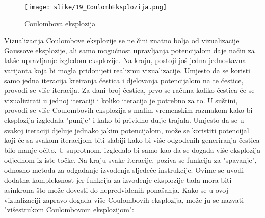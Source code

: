 \documentclass{foi}
\begin{document}
\begin{figure}[H]
    \centering
    \texttt{[image: slike/19\_CoulombEksplozija.png]}
    \captionsetup{justification=centering}
    \caption{Coulombova eksplozija}
\label{fig:CoulombEksplozija}
\end{figure}

Vizualizacija Coulombove eksplozije se ne čini znatno bolja od vizualizacije Gaussove eksplozije, ali samo mogućnost upravljanja potencijalom daje način za lakše upravljanje izgledom eksplozije. Na kraju, postoji još jedna jednostavna varijanta koja bi mogla pridonijeti realizmu vizualizacije. Umjesto da se koristi samo jedna iteracija kreiranja čestica i djelovanja potencijalom na te čestice, provodi se više iteracija. Za dani broj čestica, prvo se računa koliko čestica će se vizualizirati u jednoj iteraciji i koliko iteracija je potrebno za to. U suštini, provodi se više Coulombovih eksplozija s malim vremenskim razmakom kako bi eksplozija izgledala "punije" i kako bi prividno dulje trajala. Umjesto da se u svakoj iteraciji djeluje jednako jakim potencijalom, može se koristiti potencijal koji će sa svakom iteracijom biti slabiji kako bi više odgođenih generiranja čestica bilo manje očito. U suprotnom, izgledalo bi samo kao da se događa više eksplozija odjednom iz iste točke. Na kraju svake iteracije, poziva se funkcija za "spavanje", odnosno metoda za odgađanje izvođenja sljedeće instrukcije. Ovime se uvodi dodatna kompleksnost jer funkcija za izvođenje eksplozije tada mora biti asinkrona što može dovesti do nepredviđenih ponašanja. Kako se u ovoj vizualizaciji zapravo događa više Coulombovih eksplozija, može ju se nazvati "višestrukom Coulombovom eksplozijom":
\end{document}
